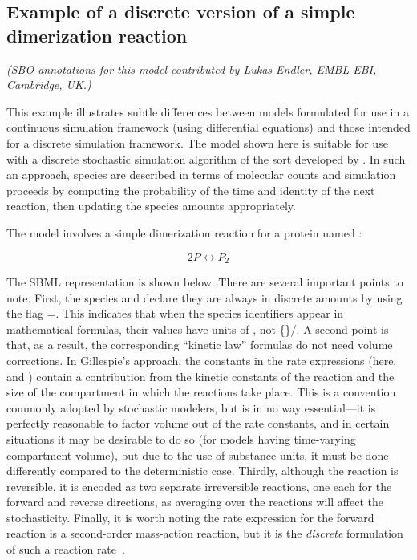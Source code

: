 
\subsection{Example of a discrete version of a simple dimerization reaction}
\label{sec:discrete-eg}

\emph{(SBO annotations for this model contributed by Lukas Endler,
  EMBL-EBI, Cambridge, UK.)}

This example illustrates subtle differences between models
formulated for use in a continuous simulation framework (\eg using
differential equations) and those intended for a discrete
simulation framework.  The model shown here is suitable for use
with a discrete stochastic simulation algorithm of the sort
developed by \cite{gillespie:1977}.  In such an approach, species
are described in terms of molecular counts and simulation
proceeds by computing the probability of the time and identity of
the next reaction, then updating the species amounts
appropriately.

The model involves a simple dimerization reaction for a protein
named :
\begin{linenomath}
\begin{equation*}
    2 P  \leftrightarrow  P_2
\end{equation*}
\end{linenomath}
The SBML representation is shown below.  There are several
important points to note.  First, the species  and 
declare they are always in discrete amounts by using the flag
=.  This indicates that
when the species identifiers appear in mathematical formulas,
their values have units of , not
\{\}/.  A second point is that, as a
result, the corresponding ``kinetic law'' formulas do not need
volume corrections.  In Gillespie's approach, the constants in the
rate expressions (here,  and ) contain a
contribution from the kinetic constants of the reaction and the
size of the compartment in which the reactions take place. This is
a convention commonly adopted by stochastic modelers, but is in no
way essential---it is perfectly reasonable to factor volume out of
the rate constants, and in certain situations it may be desirable
to do so (\eg for models having time-varying compartment volume),
but due to the use of substance units, it must be done differently
compared to the deterministic case.  Thirdly, although the
reaction is reversible, it is encoded as two separate irreversible
reactions, one each for the forward and reverse directions, as
averaging over the reactions will affect the stochasticity.
Finally, it is worth noting the rate expression for the forward
reaction is a second-order mass-action reaction, but it is the
\emph{discrete} formulation of such a reaction
rate~\citep{gillespie:1977}.

